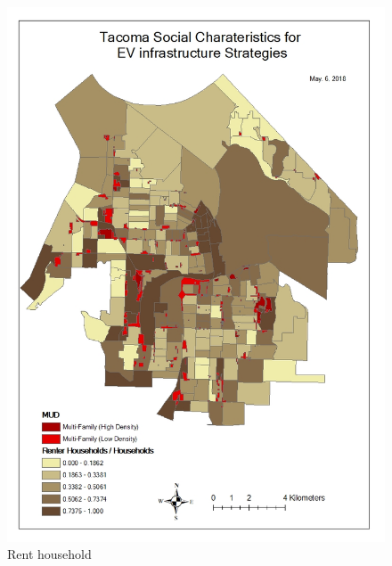 \documentclass[]{article}
\begin{document}
\begin{figure}
\centering
\includegraphics{./figs/Rent.jpg}
\caption{Rent household}
\end{figure}
\end{document}

